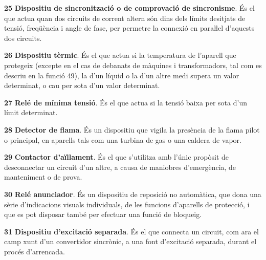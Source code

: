 \begin{multicols}{2}
\begin{list}{}
\item[\textbf{25}]   
\textbf{Dispositiu de sincronització o de comprovació de sincronisme}. És el que actua quan dos circuits de corrent altern
són dins dels límits desitjats de tensió, freqüència i angle de
fase, per permetre la connexió en paraŀlel d'aquests dos circuits.


\item[\textbf{26}]    
\textbf{Dispositiu tèrmic}. És el que
actua si la temperatura de l'aparell que protegeix (excepte en el cas de debanats de màquines i transformadors, tal com es descriu en la funció 49), la d'un líquid o la d'un altre medi  supera un valor
determinat, o cau per sota d'un valor determinat.


\item[\textbf{27}]   
\textbf{Relé de mínima tensió}. És el que
actua si la tensió baixa per sota d'un límit determinat.

\item[\textbf{28}]   
\textbf{Detector de flama}. És un dispositiu que vigila la presència de la flama pilot o principal, en aparells tals com una turbina de gas o una caldera  de vapor.

\item[\textbf{29}]  
\textbf{Contactor d'aïllament}. És el que
s'utilitza amb l'únic propòsit de desconnectar un circuit d'un
altre,  a  causa de maniobres    d'emergència,  de manteniment o de
prova.

\item[\textbf{30}]  
 \textbf{Relé anunciador}. És un dispositiu de
reposició no automàtica, que dona una sèrie d'indicacions visuals
individuals, de les funcions d'aparells de protecció, i que es pot
disposar també per efectuar una funció de bloqueig.

\item[\textbf{31}]  
\textbf{Dispositiu d'excitació separada}. És el que connecta un circuit, com ara el camp xunt
d'un convertidor sincrònic, a una font d'excitació separada, durant el procés
d'arrencada.


\end{list}
\end{multicols}
